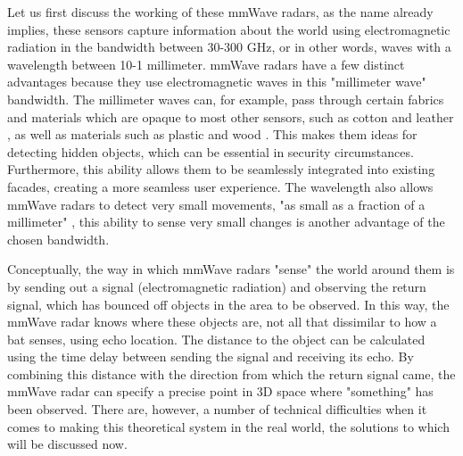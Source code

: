 Let us first discuss the working of these mmWave radars, as the name already implies, these sensors capture information about the world using electromagnetic radiation in the bandwidth between 30-300 GHz, or in other words, waves with a wavelength between 10-1 millimeter.
mmWave radars have a few distinct advantages because they use electromagnetic waves in this "millimeter wave" bandwidth.
The millimeter waves can, for example, pass through certain fabrics and materials which are opaque to most other sensors, such as cotton and leather \cite{meier2020propagation}, as well as materials such as plastic and wood \cite{kapilevich2011fmcw}.
This makes them ideas for detecting hidden objects, which can be essential in security circumstances.
Furthermore, this ability allows them to be seamlessly integrated into existing facades, creating a more seamless user experience.
The wavelength also allows mmWave radars to detect very small movements, "as small as a fraction of a millimeter" \cite[p.~2]{ti2020fundamentals}, this ability to sense very small changes is another advantage of the chosen bandwidth.

Conceptually, the way in which mmWave radars "sense" the world around them is by sending out a signal (electromagnetic radiation) and observing the return signal, which has bounced off objects in the area to be observed.
In this way, the mmWave radar knows where these objects are, not all that dissimilar to how a bat senses, using echo location.
The distance to the object can be calculated using the time delay between sending the signal and receiving its echo.
By combining this distance with the direction from which the return signal came, the mmWave radar can specify a precise point in 3D space where "something" has been observed.
There are, however, a number of technical difficulties when it comes to making this theoretical system in the real world, the solutions to which will be discussed now.

